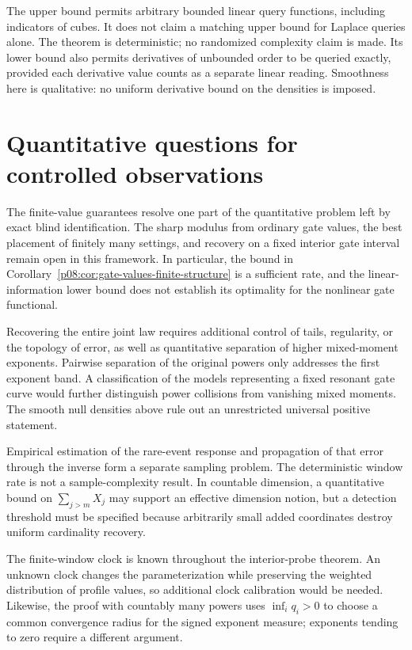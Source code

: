 \documentclass[11pt,letterpaper]{article}
\theoremstyle{definition}
\theoremstyle{remark}
\newcommand{\1}{\mathbf 1}
\begin{document}
The upper bound permits arbitrary bounded linear query functions, including
indicators of cubes.  It does not claim a matching upper bound for Laplace
queries alone.  The theorem is deterministic; no randomized complexity
claim is made.  Its lower bound also permits derivatives of unbounded order
to be queried exactly, provided each derivative value counts as a separate
linear reading.  Smoothness here is qualitative: no uniform derivative
bound on the densities is imposed.

\section{Quantitative questions for controlled observations}
\label{p07:sec:questions}The finite-value guarantees resolve one part of the quantitative problem
left by exact blind identification. The sharp modulus from ordinary gate
values, the best placement of finitely many settings, and recovery on a
fixed interior gate interval remain open in this framework. In particular,
the bound in Corollary~\ref{p08:cor:gate-values-finite-structure} is a
sufficient rate, and the linear-information lower bound does not establish
its optimality for the nonlinear gate functional.

Recovering the entire joint law requires additional control of tails,
regularity, or the topology of error, as well as quantitative separation
of higher mixed-moment exponents. Pairwise separation of the original
powers only addresses the first exponent band. A classification of the
models representing a fixed resonant gate curve would further distinguish
power collisions from vanishing mixed moments. The smooth null densities
above rule out an unrestricted universal positive statement.

Empirical estimation of the rare-event response and propagation of that
error through the inverse form a separate sampling problem. The
deterministic window rate is not a sample-complexity result. In countable
dimension, a quantitative bound on $\sum_{j>m}X_j$ may support an effective
dimension notion, but a detection threshold must be specified because
arbitrarily small added coordinates destroy uniform cardinality recovery.

The finite-window clock is known throughout the interior-probe theorem.
An unknown clock changes the parameterization while preserving the
weighted distribution of profile values, so additional clock calibration
would be needed. Likewise, the proof with countably many powers uses
$\inf_iq_i>0$ to choose a common convergence radius for the signed
exponent measure; exponents tending to zero require a different argument.
\end{document}
